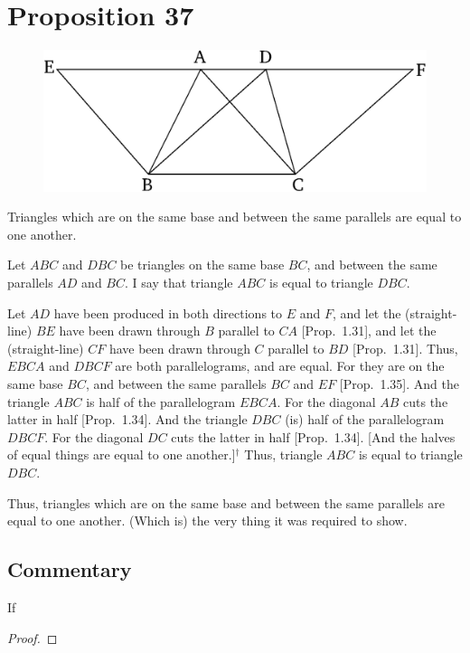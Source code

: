 \chapter*{Proposition 37}



\begin{figure}[ht]
    \begin{center}
    \includegraphics[width=0.5\linewidth]{figures/fig37e.eps}
    \label{fig:prop_37}
    \end{center}
\end{figure}

Triangles which are on the same base and between the same parallels
are equal to one another.

Let $ABC$ and $DBC$ be triangles on the same base $BC$, and between
the same parallels $AD$ and $BC$. I say that triangle $ABC$ is equal to triangle $DBC$.

Let $AD$ have been produced in both directions to $E$ and $F$, and let the
(straight-line) $BE$ have been drawn through $B$ parallel to $CA$ [Prop.~1.31],
and let the (straight-line) $CF$ have been drawn through $C$ parallel to
$BD$ [Prop.~1.31]. Thus, $EBCA$ and $DBCF$ are both parallelograms,
and are equal. For they are on the same base $BC$, and between
the same parallels $BC$ and $EF$ [Prop.~1.35]. And the triangle $ABC$ is
half of 
the parallelogram
$EBCA$. For the diagonal $AB$ cuts the latter in half [Prop.~1.34]. And the 
triangle $DBC$ (is) half of the parallelogram $DBCF$. For the diagonal
$DC$ cuts the latter in half [Prop.~1.34]. [And the halves of equal things are
equal to one another.]$^\dag$
Thus, triangle $ABC$ is equal to triangle $DBC$.

Thus, triangles which are on the same base and between the same parallels
are equal to one another. (Which is) the very thing it was required to show.


\section*{Commentary}

\begin{proposition}\label{proposition_37}\leanok
    If
\end{proposition}
\begin{proof}
    \leanok
\end{proof}
